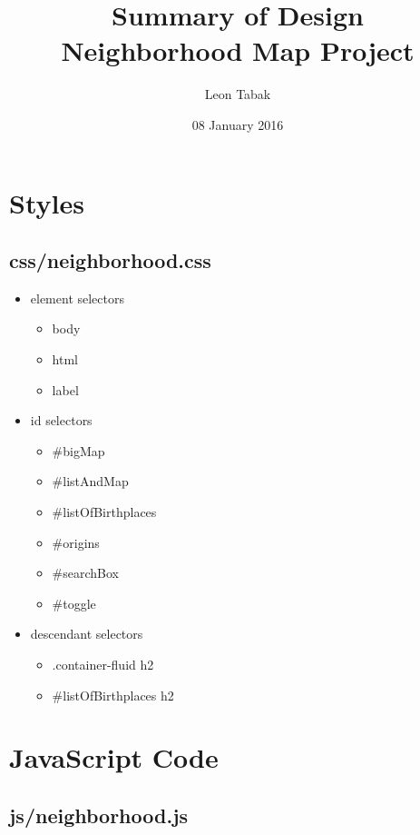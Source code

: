 \documentclass[twoside]{article}
\title{Summary of Design \\
  Neighborhood Map Project}
\author{Leon Tabak}
\date{08 January 2016}
\begin{document}
\maketitle

\section*{Styles}

\subsection*{css/neighborhood.css}

\begin{itemize}
  \item element selectors
  \begin{itemize}
    \item body
    \item html
    \item label
    \end{itemize}

  \item id selectors
  \begin{itemize}
    \item \#bigMap
    \item \#listAndMap
    \item \#listOfBirthplaces
    \item \#origins
    \item \#searchBox
    \item \#toggle
    \end{itemize}

  \item descendant selectors
  \begin{itemize}
    \item .container-fluid h2
    \item \#listOfBirthplaces h2
    \end{itemize}
  \end{itemize}

\section*{JavaScript Code}

\subsection*{js/neighborhood.js}
\end{document}
